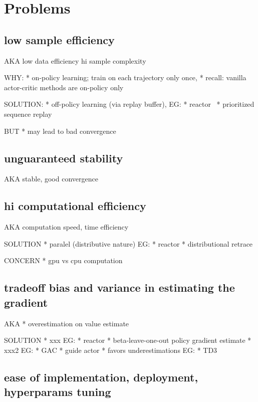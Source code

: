 \section{Problems}

\subsection{low sample efficiency}
AKA
low data efficiency
hi sample complexity

WHY:
* on-policy learning; train on each trajectory only once,
  * recall: vanilla actor-critic methods are on-policy only

SOLUTION:
* off-policy learning (via replay buffer),
  EG:
  * reactor~\cite{Gruslys2018}
    * prioritized sequence replay

  BUT
  * may lead to bad convergence

\subsection{unguaranteed stability}
AKA
stable, good convergence

\subsection{hi computational efficiency}
AKA
computation speed,
time efficiency

SOLUTION
* paralel (distributive nature)
  EG:
  * reactor
    * distributional retrace

CONCERN
* gpu vs cpu computation

\subsection{tradeoff bias and variance in estimating the gradient}
AKA
* overestimation on value estimate

SOLUTION
* xxx
  EG:
  * reactor
    * beta-leave-one-out policy gradient estimate
* xxx2
  EG:
  * GAC
    * guide actor
* favors underestimations
  EG:
  * TD3

\subsection{ease of implementation, deployment, hyperparams tuning}


